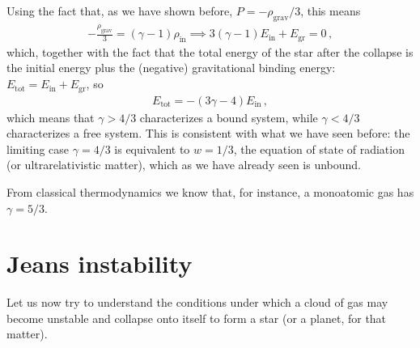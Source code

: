 \documentclass[main.tex]{subfiles}
\begin{document}

Using the fact that, as we have shown before, \(P = - \rho _{\text{grav}} / 3\), this means 
%
\begin{align}
- \frac{\rho _{\text{grav}}}{3} = (\gamma - 1) \rho _{\text{in}} \implies
  3(\gamma -1 ) E _{\text{in}} + E _{\text{gr}} = 0
\,,
\end{align}
%
which, together with the fact that the total energy of the star after the collapse is the initial energy plus the (negative) gravitational binding energy: \(E _{\text{tot}} = E _{\text{in}} + E _{\text{gr}}\), so 
%
\begin{align}
  E _{\text{tot}} = - (3 \gamma - 4) E _{\text{in}}
\,,
\end{align}
%
which means that \(\gamma > 4/3\) characterizes a bound system, while \(\gamma < 4/3\) characterizes a free system. 
This is consistent with what we have seen before: the limiting case \(\gamma = 4/3\) is equivalent to \(w = 1/3\), the equation of state of radiation (or ultrarelativistic matter), which as we have already seen is unbound.

From classical thermodynamics we know that, for instance, a monoatomic gas has \(\gamma = 5 /3\).


\section{Jeans instability}

% 
Let us now try to understand the conditions under which a cloud of gas may become unstable and collapse onto itself to form a star (or a planet, for that matter). 
\end{document}
